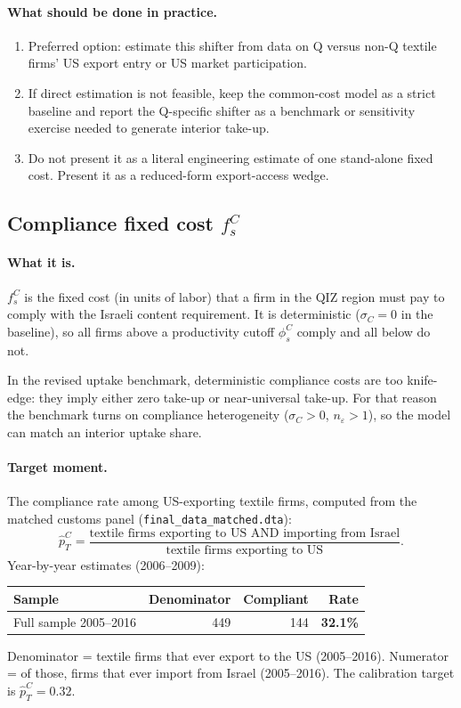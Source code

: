 \documentclass[12pt]{article}
\begin{document}
\paragraph{What should be done in practice.}
\begin{enumerate}
  \item Preferred option: estimate this shifter from data on Q versus non-Q
        textile firms' US export entry or US market participation.
  \item If direct estimation is not feasible, keep the common-cost model as a
        strict baseline and report the Q-specific shifter as a benchmark or
        sensitivity exercise needed to generate interior take-up.
  \item Do not present it as a literal engineering estimate of one stand-alone
        fixed cost. Present it as a reduced-form export-access wedge.
\end{enumerate}

\subsection{Compliance fixed cost $f^C_s$}

\paragraph{What it is.}
$f^C_s$ is the fixed cost (in units of labor) that a firm in the QIZ region
must pay to comply with the Israeli content requirement. It is deterministic
($\sigma_C = 0$ in the baseline), so all firms above a productivity cutoff
$\phi^C_s$ comply and all below do not.

\medskip
\noindent In the revised uptake benchmark, deterministic compliance costs are
too knife-edge: they imply either zero take-up or near-universal take-up. For
that reason the benchmark turns on compliance heterogeneity
($\sigma_C > 0$, $n_{\varepsilon} > 1$), so the model can match an interior
uptake share.

\paragraph{Target moment.}
The compliance rate among US-exporting textile firms, computed from the
matched customs panel (\texttt{final\_data\_matched.dta}):
\[
\hat p^C_T = \frac{\text{textile firms exporting to US AND importing from Israel}}
                  {\text{textile firms exporting to US}}.
\]
Year-by-year estimates (2006--2009):
\begin{center}
\begin{tabular}{lrrr}
\toprule
Sample & Denominator & Compliant & Rate \\
\midrule
Full sample 2005--2016 & 449 & 144 & \textbf{32.1\%} \\
\bottomrule
\end{tabular}
\end{center}
Denominator = textile firms that ever export to the US (2005--2016).
Numerator = of those, firms that ever import from Israel (2005--2016).
The calibration target is $\hat p^C_T = 0.32$.
\end{document}
